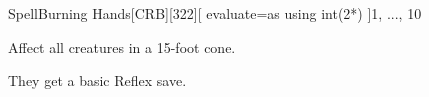 
\begin{card-collection}{Spell}{\level}{Burning Hands}[CRB][322]{\level}[
  evaluate=\level as \dice using int(2*\level)
]{1, ..., 10}%



Affect all creatures in a 15-foot cone.

They get a basic Reflex save.

\end{card-collection}%
